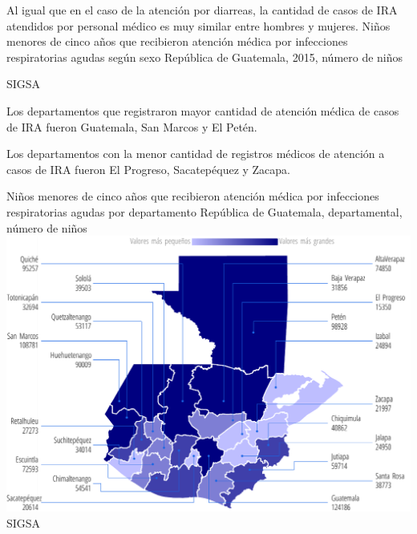
%
{%
	Al igual que en el caso de la atención por diarreas, la cantidad de casos de IRA atendidos por personal médico es muy similar entre hombres y mujeres. 
}%
{%
	Niños menores de cinco años que recibieron atención médica por infecciones respiratorias agudas según sexo} %
{%
	República de Guatemala, 2015, número de niños} %
{%
	\begin{tikzpicture}[x=1pt,y=1pt]    \end{tikzpicture}}%
{%
	SIGSA} %


%
{%
	Los departamentos que registraron mayor cantidad de atención médica de casos de IRA fueron Guatemala, San Marcos y El Petén. 
	
	Los departamentos con la menor cantidad de registros médicos de atención a casos de IRA fueron El Progreso, Sacatepéquez y Zacapa. 
}%
{%
	Niños menores de cinco años que recibieron atención médica por infecciones respiratorias agudas por departamento} %
{%
	República de Guatemala, departamental, número de niños} %
{%
	\includegraphics[width=52\cuadri]{graficas/5_17.pdf}}%
{%
	SIGSA} %
